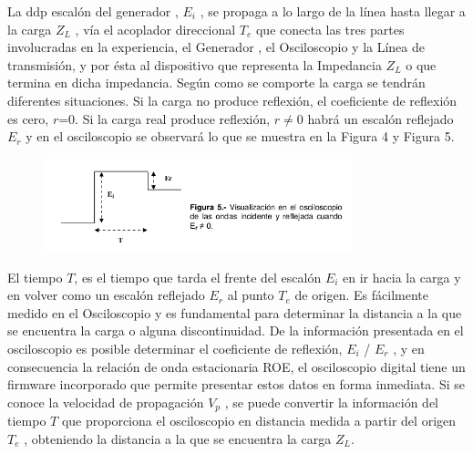 \documentclass[a4paper,12pt,twoside]{article}
\begin{document}
La ddp escalón del generador , $E_i$ , se propaga a lo largo de la línea hasta llegar a la carga $Z_L$ , vía el acoplador direccional $T_ e$ que conecta las tres partes involucradas en la experiencia, el Generador , el Osciloscopio y la Línea de transmisión, y por ésta al
dispositivo que representa la Impedancia $Z_L$ o que termina en dicha impedancia.
Según como se comporte la carga se tendrán diferentes situaciones. Si la carga no produce reflexión, el coeficiente de reflexión es cero, $r$=$0$. Si la carga real produce reflexión, $r\neq0$  habrá un escalón reflejado $E_r$ y en el osciloscopio se observará lo que se
muestra en la Figura 4 y Figura 5.

\begin{figure}[H]
    \centering
    \includegraphics[width=0.8\textwidth]{../img/tdr2.png}
\end{figure}

El tiempo $T$, es el tiempo que tarda el frente del escalón $E_i$ en ir hacia la carga y en volver
como un escalón reflejado $E_r$ al punto $T_e$ de origen. Es fácilmente medido en el
Osciloscopio y es fundamental para determinar la distancia a la que se encuentra la carga
o alguna discontinuidad.
De la información presentada en el osciloscopio es posible determinar el coeficiente de
reflexión, $E_i$ / $E_r$ , y en consecuencia la relación de onda estacionaria ROE, el osciloscopio
digital tiene un firmware incorporado que permite presentar estos datos en forma
inmediata.
Si se conoce la velocidad de propagación $V_p$ , se puede convertir la información del
tiempo $T$ que proporciona el osciloscopio en distancia medida a partir del origen $T_e$ ,
obteniendo la distancia a la que se encuentra la carga $Z_L$.
\end{document}
